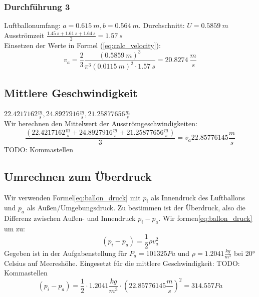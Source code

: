 \documentclass{article}
\begin{document}
    \subsubsection{Durchführung 3}
        Luftballonumfang: \(a = \SI{0.615}{m}, b = \SI{0.564}{m} \). Durchschnitt: \(U = \SI{0.5859}{m} \) \\
        Ausströmzeit \( \frac{\SI{1.45}{s} + \SI{1.61}{s} + \SI{1.64}{s} }{2} = \SI{1.57}{s} \) \\
        Einsetzen der Werte in Formel (\ref{eq:calc_velocity}):
        \[ v_a = \frac{2}{3} \frac{{( \SI{0.5859}{m} )}^3}{\pi^3 {( \SI{0.0115}{m} )}^2 \cdot \SI{1.57}{s} } = \SI{20.8274}{\frac{m}{s}} \]

    \subsection{Mittlere Geschwindigkeit}
    \( 22.4217162 \frac{m}{s}, 24.8927916 \frac{m}{s}, 21.25877656 \frac{m}{s} \) \\
    Wir berechnen den Mittelwert der Ausströmgeschwindigkeiten:
    \begin{equation} \label{val:mittlere_geschw}
        \frac{ (22.4217162 \frac{m}{s} + 24.8927916 \frac{m}{s} + 21.25877656 \frac{m}{s}) }{3} = \bar{v}_a 22.85776145 \frac{m}{s}
    \end{equation}
    TODO: Kommastellen

    \subsection{Umrechnen zum Überdruck}
    Wir verwenden Formel\ref{eq:ballon_druck} mit \(p_i\) als Innendruck des Luftballons und \(p_a\) als Außen/Umgebungsdruck.
    Zu bestimmen ist der Überdruck, also die Differenz zwischen Außen- und Innendruck \(p_i - p_a\).
    Wir formen\ref{eq:ballon_druck} um zu:
    \begin{equation} \label{eq:ballon_uberdruck}
        (p_i - p_a) = \frac{1}{2} \rho v_a^2
    \end{equation}
    Gegeben ist in der Aufgabenstellung\cite{Aufgabenstellung} für \( P_a = 101 325 Pa\) und \(\rho = 1.2041 \frac{kg}{m^3} \) bei 20° Celsius auf Meereshöhe. 
    Eingesetzt für die mittlere Geschwindigkeit: TODO: Kommastellen
    \begin{equation}
        (p_i - p_a) = \frac{1}{2} \cdot 1.2041 \frac{kg}{m^3} \cdot {(22.85776145 \frac{m}{s})}^2 = 314.557 Pa
    \end{equation}
\end{document}
